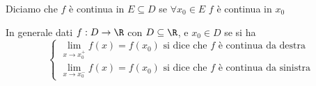     Diciamo che $ f $ è continua in $ E \subseteq D$ se $ \forall x_0 \in E $ $ f $ è continua in $ x_0 $


    In generale dati $ f:D\to \R $ con $ D \subseteq \R $, e $ x_0 \in D $ se si ha 
    \[\begin{cases}
        \displaystyle\lim_{x\to x_0^+} f(x) = f(x_0)\text{ si dice che } f \text{ è continua da destra}\\
        \displaystyle\lim_{x\to x_0^-} f(x) = f(x_0)\text{ si dice che } f \text{ è continua da sinistra}
    \end{cases}\]